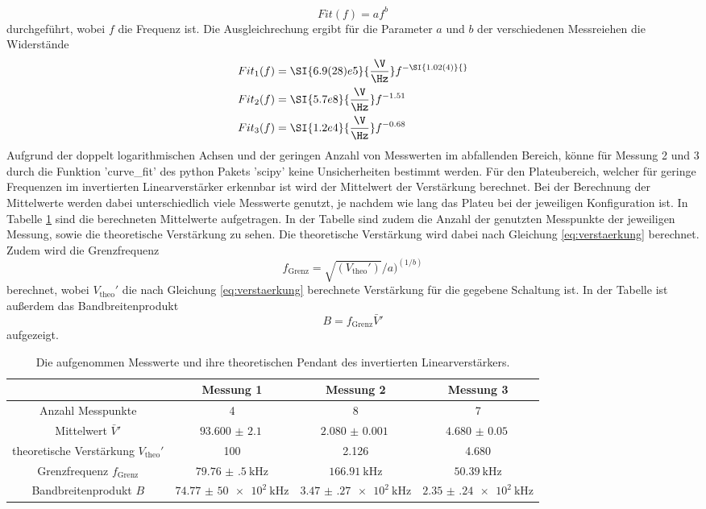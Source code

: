 \begin{equation}
    Fit(f) = a f^b
    \label{eq:fit}
\end{equation}
durchgeführt, wobei $f$ die Frequenz ist.
Die Ausgleichrechung ergibt für die Parameter $a$ und $b$ der verschiedenen Messreiehen die Widerstände
\begin{align}
    Fit_1(f) &= \SI{6.9(28)e5}{\frac{\V}{\Hz}} f^{-\SI{1.02(4)}{}} \\
    Fit_2(f) &= \SI{5.7e8}{\frac{\V}{\Hz}} f^{-1.51}\\
    Fit_3(f) &= \SI{1.2e4}{\frac{\V}{\Hz}} f^{-0.68}
\end{align}
Aufgrund der doppelt logarithmischen Achsen und der geringen Anzahl von Messwerten im abfallenden Bereich, könne für Messung 2 und 3 durch die Funktion 'curve\_fit' des python Pakets 'scipy' \cite{scipy} keine Unsicherheiten bestimmt werden.
Für den Plateubereich, welcher für geringe Frequenzen im invertierten Linearverstärker erkennbar ist wird der Mittelwert der Verstärkung berechnet.
Bei der Berechnung der Mittelwerte werden dabei unterschiedlich viele Messwerte genutzt, je nachdem wie lang das Plateu bei der jeweiligen Konfiguration ist.
In Tabelle \ref{tab:inv_lin_mittel} sind die berechneten Mittelwerte aufgetragen. 
In der Tabelle sind zudem die Anzahl der genutzten Messpunkte der jeweiligen Messung, sowie die theoretische Verstärkung zu sehen.
Die theoretische Verstärkung wird dabei nach Gleichung \eqref{eq:verstaerkung} berechnet.
Zudem wird die Grenzfrequenz 
\begin{equation*}
  f_\text{Grenz} = \sqrt{(V_\text{theo}')}/a)^{(1/b)}
\end{equation*}
berechnet, wobei $V_\text{theo}'$ die nach Gleichung \eqref{eq:verstaerkung} berechnete Verstärkung für die gegebene Schaltung ist.
In der Tabelle ist außerdem das Bandbreitenprodukt
\begin{equation*}
    B = f_\text{Grenz}\bar{V}'
\end{equation*}
aufgezeigt.
\begin{table}
    \hspace*{-2cm}\begin{tabular}{cccc}
        \toprule
         & Messung 1 & Messung 2 & Messung 3\\
        \midrule
        Anzahl Messpunkte & 4 & 8 & 7 \\
        Mittelwert $\bar{V}'$ & $\SI{93.600(2100)}{}$ &  $\SI{2.080(1)}{} $&  $\SI{4.680(50)}{} $ \\
        theoretische Verstärkung $V_\text{theo}'$ & 100 & 2.126 & 4.680 \\
        Grenzfrequenz $f_\text{Grenz}$ & $\SI{79.76(50)}{\kilo\Hz}$ & $\SI{166.91}{\kilo\Hz} $& $\SI{50.39}{\kilo\Hz}$  \\
        Bandbreitenprodukt $B$ & $\SI{74.77(5000)e2}{\kilo\Hz}$ & $\SI{3.47(27)e2}{\kilo\Hz}$ & $\SI{2.35(24)e2}{\kilo\Hz}$ \\
        \bottomrule
    \end{tabular}
    \caption{Die aufgenommen Messwerte und ihre theoretischen Pendant des invertierten Linearverstärkers.}
    \label{tab:inv_lin_mittel}
\end{table} 
